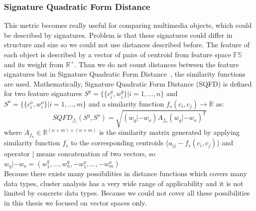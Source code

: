 \subsubsection{Signature Quadratic Form Distance}
This metric becomes really useful for comparing multimedia objects, which could be described by signatures. Problem is that these signatures could differ in structure and size so we could not use distances described before. The feature of each object is described by a vector of pairs of centroid from feature space $\mathbb{FS}$ and its weight from $\mathbb{R^{+}}$.
Than we do not count distances between the feature signatures but in Signature Quadratic Form Distance~\cite{Beecks10}, the similarity functions are used.
Mathematically, Signature Quadratic Form Distance (SQFD) is defined for two feature signatures $S^{q} = \{\{c_i^q, w_i^q\}|i=1,...,n\}$ and $S^{o} = \{\{c_i^o, w_i^o\}|i=1,...,m\}$ and a similarity function $f_s(c_i,c_j) \to \mathbb{R}$ as:
$$SQFD_{f_s}(S^q,S^o)=\sqrt{(w_q|-w_o)A_{f_n}(w_q|-w_o)^T}$$
where $A_{f_n} \in \mathbb{R}^{(n+m)\times(n+m)}$ is the similarity matrix generated by applying similarity function $f_s$ to the corresponding centroids ($a_{ij}-f_s(c_i,c_j)$) and operator $|$ means concatenation of two vectors, so $w_q|-w_o = (w_1^q,...,w_n^q,-w_1^o,...,-w_m^o)$\\

Because there exists many possibilities in distance functions which covers many data types, cluster analysis has a very wide range of applicability and it is not limited by concrete data types. Because we could not cover all these possibilities in this thesis we focused on vector spaces only.

